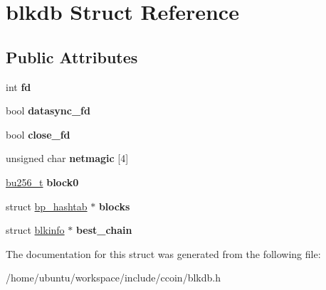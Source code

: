 \hypertarget{structblkdb}{\section{blkdb Struct Reference}
\label{structblkdb}
}
\subsection*{Public Attributes}
\begin{DoxyCompactItemize}
\item 
\hypertarget{structblkdb_af8adc6ef16ca8a250edabf2d5217cf8f}{int {\bfseries fd}}\label{structblkdb_af8adc6ef16ca8a250edabf2d5217cf8f}

\item 
\hypertarget{structblkdb_aca739298c5c904a940b558e77275bd84}{bool {\bfseries datasync\-\_\-fd}}\label{structblkdb_aca739298c5c904a940b558e77275bd84}

\item 
\hypertarget{structblkdb_a4d641b25e98c9a831cf409c2cda9b55d}{bool {\bfseries close\-\_\-fd}}\label{structblkdb_a4d641b25e98c9a831cf409c2cda9b55d}

\item 
\hypertarget{structblkdb_a4d368b513f2c27d054802c96251da51b}{unsigned char {\bfseries netmagic} \mbox{[}4\mbox{]}}\label{structblkdb_a4d368b513f2c27d054802c96251da51b}

\item 
\hypertarget{structblkdb_ab984ac80c24afe1657379ca4f87dd48c}{\hyperlink{structbu256}{bu256\-\_\-t} {\bfseries block0}}\label{structblkdb_ab984ac80c24afe1657379ca4f87dd48c}

\item 
\hypertarget{structblkdb_a911a5b64ad585c869ea06bc28eda37c6}{struct \hyperlink{structbp__hashtab}{bp\-\_\-hashtab} $\ast$ {\bfseries blocks}}\label{structblkdb_a911a5b64ad585c869ea06bc28eda37c6}

\item 
\hypertarget{structblkdb_a53bdbc6d1b2ee95f577e2dad72452428}{struct \hyperlink{structblkinfo}{blkinfo} $\ast$ {\bfseries best\-\_\-chain}}\label{structblkdb_a53bdbc6d1b2ee95f577e2dad72452428}

\end{DoxyCompactItemize}


The documentation for this struct was generated from the following file\-:\begin{DoxyCompactItemize}
\item 
/home/ubuntu/workspace/include/ccoin/blkdb.\-h\end{DoxyCompactItemize}
